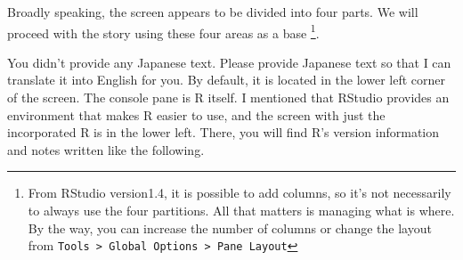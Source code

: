 \documentclass{ltjsbook}
\begin{document}
Broadly speaking, the screen appears to be divided into four parts. We will proceed with the story using these four areas as a base \footnote{From RStudio version1.4, it is possible to add columns, so it's not necessarily to always use the four partitions. All that matters is managing what is where. By the way, you can increase the number of columns or change the layout from \verb|Tools > Global Options > Pane Layout|}.







You didn't provide any Japanese text. Please provide Japanese text so that I can translate it into English for you.
By default, it is located in the lower left corner of the screen. The console pane is R itself.
I mentioned that RStudio provides an environment that makes R easier to use, and the screen with just the incorporated R is in the lower left. There, you will find R's version information and notes written like the following.

\end{document}
